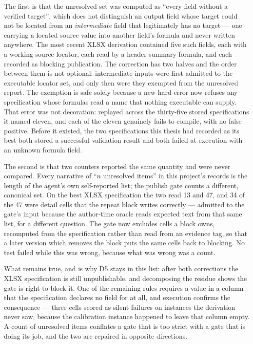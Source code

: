 The first is that the unresolved set was computed as ``every field without a verified
target'', which does not distinguish an output field whose target could not be located from an
\emph{intermediate} field that legitimately has no target --- one carrying a located source
value into another field's formula and never written anywhere. The most recent XLSX derivation
contained five such fields, each with a working source locator, each read by a
header-summary formula, and each recorded as blocking publication. The correction has two
halves and the order between them is not optional: intermediate inputs were first admitted to
the executable locator set, and only then were they exempted from the unresolved report. The
exemption is safe solely because a new hard error now refuses any specification whose formulas
read a name that nothing executable can supply. That error was not decoration: replayed across
the thirty-five stored specifications it named eleven, and each of the eleven genuinely fails
to compile, with no false positive. Before it existed, the two specifications this thesis had
recorded as its best both stored a successful validation result and both failed at execution
with an unknown formula field.

The second is that two counters reported the same quantity and were never compared. Every
narrative of ``\(n\) unresolved items'' in this project's records is the length of the agent's
own self-reported list; the publish gate counts a different, canonical set. On the best XLSX
specification the two read 13 and 47, and 34 of the 47 were detail cells that the repeat block
writes correctly --- admitted to the gate's input because the author-time oracle reads expected
text from that same list, for a different question. The gate now excludes cells a block owns,
recomputed from the specification rather than read from an evidence tag, so that a later
version which removes the block puts the same cells back to blocking. No test failed while this
was wrong, because what was wrong was a count.

What remains true, and is why D5 stays in this list: after both corrections the XLSX
specification is still unpublishable, and decomposing the residue shows the gate is right to
block it. One of the remaining rules requires a value in a column that the specification
declares no field for at all, and execution confirms the consequence --- three cells scored as
silent failures on instances the derivation never saw, because the calibration instance
happened to leave that column empty. A count of unresolved items conflates a gate that is too
strict with a gate that is doing its job, and the two are repaired in opposite directions.

